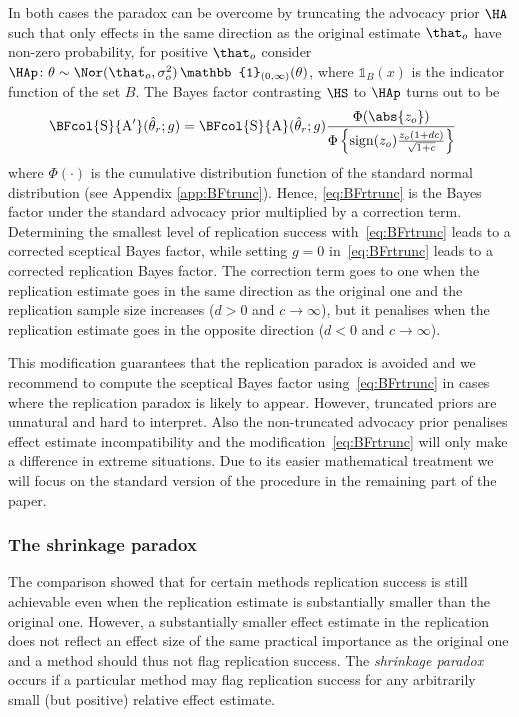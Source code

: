 In both cases the paradox can be overcome by truncating the advocacy prior $\HA$
such that only effects in the same direction as the original estimate $\that_o$
have non-zero probability, \ie for positive $\that_{o}$ consider
$\HAp \colon \theta \sim \Nor(\that_o, \sigma^2_o) \, \mathbb{1}_{(0, \infty)}(\theta)$,
where $\mathbb{1}_{B}(x)$ is the indicator function of the set $B$. The Bayes
factor contrasting $\HS$ to $\HAp$ turns out to be
\begin{align}
  \BFcol{\mathrm{S}}{\mathrm{A}^\prime}(\hat{\theta}_r; g)
  &= \BFcol{\mathrm{S}}{\mathrm{A}}(\hat{\theta}_r; g)
  \frac{\Phi(\abs{z_o})}{\Phi\left\{\mathrm{sign}(z_o)
    \frac{z_o(1 + dc)}{\sqrt{1 + c}} \right\}}
   \label{eq:BFrtrunc}
\end{align}
where $\Phi(\cdot)$ is the cumulative distribution function of the standard
normal distribution (see Appendix \ref{app:BFtrunc}). Hence, \eqref{eq:BFrtrunc}
is the Bayes factor under the standard advocacy prior multiplied by a correction
term. Determining the smallest level of replication success
with~\eqref{eq:BFrtrunc} leads to a corrected sceptical Bayes factor, while
setting $g = 0$ in~\eqref{eq:BFrtrunc} leads to a corrected replication Bayes
factor. The correction term goes to one when the replication estimate goes in
the same direction as the original one and the replication sample size increases
($d > 0$ and $c \to \infty$), but it penalises when the replication estimate
goes in the opposite direction ($d < 0$ and $c \to \infty$).

This modification guarantees that the replication paradox is avoided and we
recommend to compute the sceptical Bayes factor using~\eqref{eq:BFrtrunc} in
cases where the replication paradox is likely to appear. However, truncated
priors are unnatural and hard to interpret. Also the non-truncated advocacy
prior penalises effect estimate incompatibility and the
modification~\eqref{eq:BFrtrunc} will only make a difference in extreme
situations. Due to its easier mathematical treatment we will focus on the
standard version of the procedure in the remaining part of the paper.


\subsubsection{The shrinkage paradox}
The comparison showed that for certain methods replication success is still
achievable even when the replication estimate is substantially smaller than the
original one. However, a substantially smaller effect estimate in the
replication does not reflect an effect size of the same practical importance as
the original one and a method should thus not flag replication success. The {\em
shrinkage paradox} occurs if a particular method may flag replication success
for any arbitrarily small (but positive) relative effect estimate.

